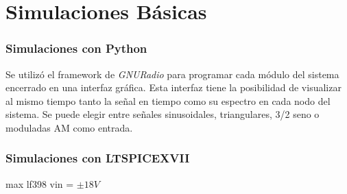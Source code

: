 


\section{Simulaciones Básicas}

\subsubsection{Simulaciones con Python}
Se utilizó el framework de \textit{GNURadio} para programar cada módulo del sistema encerrado en una interfaz gráfica. Esta interfaz tiene la posibilidad de visualizar al mismo tiempo tanto la señal en tiempo como su espectro en cada nodo del sistema. Se puede elegir entre señales sinusoidales, triangulares, 3/2 seno o moduladas AM como entrada.
\subsubsection{Simulaciones con LTSPICEXVII}

max lf398 vin = $\pm 18V$

